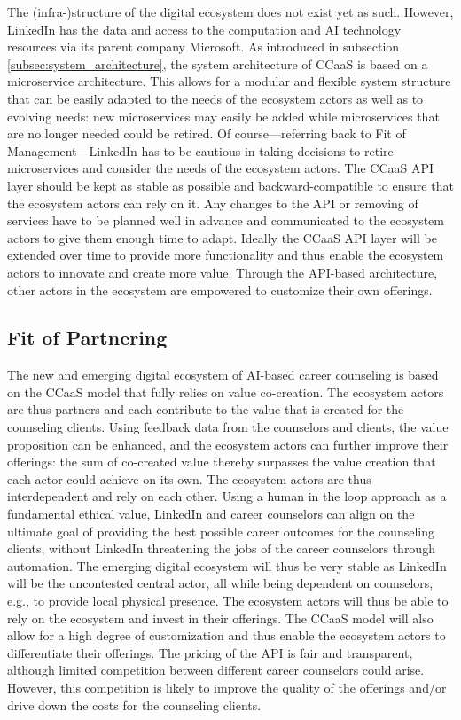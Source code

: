 The (infra-)structure of the digital ecosystem does not exist yet as such. However, LinkedIn has the
data and access to the computation and AI technology resources via its parent company Microsoft. As
introduced in subsection \ref{subsec:system_architecture}, the system architecture of CCaaS is based 
on a microservice architecture. This allows for a modular and flexible system structure that can be
easily adapted to the needs of the ecosystem actors as well as to evolving needs: new microservices 
may easily be added while microservices that are no longer needed could be retired. Of course---referring 
back to Fit of Management---LinkedIn has to be cautious in taking decisions to retire microservices 
and consider the needs of the ecosystem actors. The CCaaS API layer should be kept as stable as possible
and backward-compatible to ensure that the ecosystem actors can rely on it. Any changes to the API 
or removing of services have to be planned well in advance and communicated to the ecosystem actors
to give them enough time to adapt. Ideally the CCaaS API layer will be extended over time to provide
more functionality and thus enable the ecosystem actors to innovate and create more value. Through
the API-based architecture, other actors in the ecosystem are empowered to customize their own offerings.


\subsection{Fit of Partnering}

The new and emerging digital ecosystem of AI-based career counseling is based on the CCaaS model
that fully relies on value co-creation. The ecosystem actors are thus partners and each contribute
to the value that is created for the counseling clients. Using feedback data from the counselors and
clients, the value proposition can be enhanced, and the ecosystem actors can further improve their
offerings: the sum of co-created value thereby surpasses the value creation that each actor could
achieve on its own. The ecosystem actors are thus interdependent and rely on each other. Using a
human in the loop approach as a fundamental ethical value, LinkedIn and career counselors can align
on the ultimate goal of providing the best possible career outcomes for the counseling clients,
without LinkedIn threatening the jobs of the career counselors through automation. The emerging
digital ecosystem will thus be very stable as LinkedIn will be the uncontested central actor, all 
while being dependent on counselors, e.g., to provide local physical presence. The ecosystem actors
will thus be able to rely on the ecosystem and invest in their offerings. The CCaaS model will also
allow for a high degree of customization and thus enable the ecosystem actors to differentiate their
offerings. The pricing of the API is fair and transparent, although limited competition between
different career counselors could arise. However, this competition is likely to improve the quality
of the offerings and/or drive down the costs for the counseling clients. 


